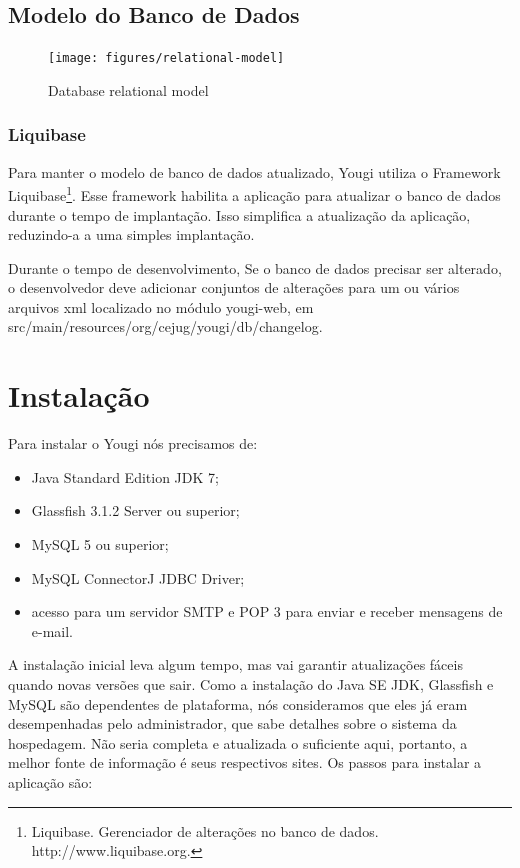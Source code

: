 \documentclass[envcountsame,envcountchap,letterpaper]{svmono}
\begin{document}
\section{Modelo do Banco de Dados}

\begin{figure}
\centering
\texttt{[image: figures/relational-model]}
\caption{Database relational model}
\label{fig:relational-model}
\end{figure}

\subsection{Liquibase}

Para manter o modelo de banco de dados atualizado, Yougi utiliza o Framework Liquibase\footnote{Liquibase. Gerenciador de alterações no banco de dados.  http://www.liquibase.org.}. Esse framework habilita a aplicação para atualizar o banco de dados durante o tempo de implantação. Isso simplifica a atualização da aplicação, reduzindo-a a uma simples implantação.

Durante o tempo de desenvolvimento, Se o banco de dados precisar ser alterado, o desenvolvedor deve adicionar conjuntos de alterações para um ou vários arquivos xml localizado no módulo yougi-web, em src/main/resources/org/cejug/yougi/db/changelog.

\chapter{Instalação}

Para instalar o Yougi nós precisamos de:

\begin{itemize}
\item Java Standard Edition JDK 7;
\item Glassfish 3.1.2 Server ou superior;
\item MySQL 5 ou superior;
\item MySQL ConnectorJ JDBC Driver;
\item acesso para um servidor SMTP e POP 3 para enviar e receber 			  mensagens de e-mail.
\end{itemize}

A instalação inicial leva algum tempo, mas vai garantir atualizações fáceis quando novas versões que sair. Como a instalação do Java SE JDK, Glassfish e MySQL são dependentes de plataforma, nós consideramos que eles já eram desempenhadas pelo administrador, que sabe detalhes sobre o sistema da hospedagem. Não seria completa e atualizada o suficiente aqui, portanto, a melhor fonte de informação é seus respectivos sites. Os passos para instalar a aplicação são:
\end{document}
